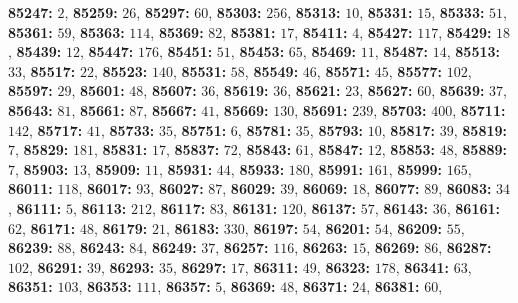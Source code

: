 \textsf{\bfseries 85247:} $2$, \textsf{\bfseries 85259:} $26$, \textsf{\bfseries 85297:} $60$, \textsf{\bfseries 85303:} $256$, \textsf{\bfseries 85313:} $10$, \textsf{\bfseries 85331:} $15$, \textsf{\bfseries 85333:} $51$, \textsf{\bfseries 85361:} $59$, \textsf{\bfseries 85363:} $114$, \textsf{\bfseries 85369:} $82$, \textsf{\bfseries 85381:} $17$, \textsf{\bfseries 85411:} $4$, \textsf{\bfseries 85427:} $117$, \textsf{\bfseries 85429:} $18$, \textsf{\bfseries 85439:} $12$, \textsf{\bfseries 85447:} $176$, \textsf{\bfseries 85451:} $51$, \textsf{\bfseries 85453:} $65$, \textsf{\bfseries 85469:} $11$, \textsf{\bfseries 85487:} $14$, \textsf{\bfseries 85513:} $33$, \textsf{\bfseries 85517:} $22$, \textsf{\bfseries 85523:} $140$, \textsf{\bfseries 85531:} $58$, \textsf{\bfseries 85549:} $46$, \textsf{\bfseries 85571:} $45$, \textsf{\bfseries 85577:} $102$, \textsf{\bfseries 85597:} $29$, \textsf{\bfseries 85601:} $48$, \textsf{\bfseries 85607:} $36$, \textsf{\bfseries 85619:} $36$, \textsf{\bfseries 85621:} $23$, \textsf{\bfseries 85627:} $60$, \textsf{\bfseries 85639:} $37$, \textsf{\bfseries 85643:} $81$, \textsf{\bfseries 85661:} $87$, \textsf{\bfseries 85667:} $41$, \textsf{\bfseries 85669:} $130$, \textsf{\bfseries 85691:} $239$, \textsf{\bfseries 85703:} $400$, \textsf{\bfseries 85711:} $142$, \textsf{\bfseries 85717:} $41$, \textsf{\bfseries 85733:} $35$, \textsf{\bfseries 85751:} $6$, \textsf{\bfseries 85781:} $35$, \textsf{\bfseries 85793:} $10$, \textsf{\bfseries 85817:} $39$, \textsf{\bfseries 85819:} $7$, \textsf{\bfseries 85829:} $181$, \textsf{\bfseries 85831:} $17$, \textsf{\bfseries 85837:} $72$, \textsf{\bfseries 85843:} $61$, \textsf{\bfseries 85847:} $12$, \textsf{\bfseries 85853:} $48$, \textsf{\bfseries 85889:} $7$, \textsf{\bfseries 85903:} $13$, \textsf{\bfseries 85909:} $11$, \textsf{\bfseries 85931:} $44$, \textsf{\bfseries 85933:} $180$, \textsf{\bfseries 85991:} $161$, \textsf{\bfseries 85999:} $165$, \textsf{\bfseries 86011:} $118$, \textsf{\bfseries 86017:} $93$, \textsf{\bfseries 86027:} $87$, \textsf{\bfseries 86029:} $39$, \textsf{\bfseries 86069:} $18$, \textsf{\bfseries 86077:} $89$, \textsf{\bfseries 86083:} $34$, \textsf{\bfseries 86111:} $5$, \textsf{\bfseries 86113:} $212$, \textsf{\bfseries 86117:} $83$, \textsf{\bfseries 86131:} $120$, \textsf{\bfseries 86137:} $57$, \textsf{\bfseries 86143:} $36$, \textsf{\bfseries 86161:} $62$, \textsf{\bfseries 86171:} $48$, \textsf{\bfseries 86179:} $21$, \textsf{\bfseries 86183:} $330$, \textsf{\bfseries 86197:} $54$, \textsf{\bfseries 86201:} $54$, \textsf{\bfseries 86209:} $55$, \textsf{\bfseries 86239:} $88$, \textsf{\bfseries 86243:} $84$, \textsf{\bfseries 86249:} $37$, \textsf{\bfseries 86257:} $116$, \textsf{\bfseries 86263:} $15$, \textsf{\bfseries 86269:} $86$, \textsf{\bfseries 86287:} $102$, \textsf{\bfseries 86291:} $39$, \textsf{\bfseries 86293:} $35$, \textsf{\bfseries 86297:} $17$, \textsf{\bfseries 86311:} $49$, \textsf{\bfseries 86323:} $178$, \textsf{\bfseries 86341:} $63$, \textsf{\bfseries 86351:} $103$, \textsf{\bfseries 86353:} $111$, \textsf{\bfseries 86357:} $5$, \textsf{\bfseries 86369:} $48$, \textsf{\bfseries 86371:} $24$, \textsf{\bfseries 86381:} $60$, 
